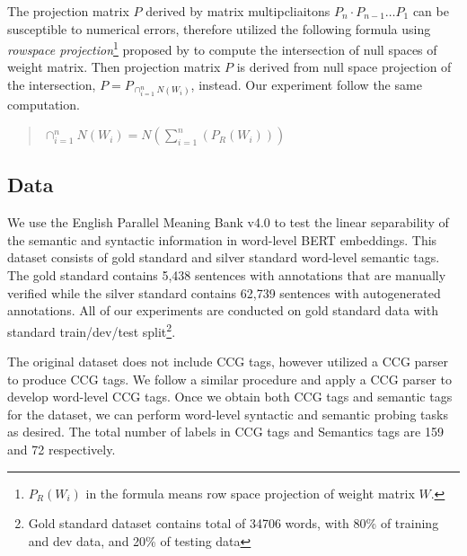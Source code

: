 \documentclass[11pt,a4paper]{article}
\begin{document}

The projection matrix $P$ derived by matrix multipcliaitons $P_n\cdot P_{n-1} \dots P_1$ can be susceptible to numerical errors, therefore \citealp{inlp} utilized the following formula using \textit{rowspace projection}\footnote{$P_R(W_i)$ in the formula means row space projection of weight matrix $W$.}  proposed by \citealp{ben-israel_2015} to compute the intersection of null spaces of weight matrix. Then projection matrix $P$ is derived from null space projection of the intersection, $P=P_{\cap_{i=1}^n N(W_i)}$, instead. Our experiment follow the same computation. 

\begin{quote}
    $\cap_{i=1}^n N(W_i) = N(\sum_{i=1}^n(P_R(W_i)) )$ 
\end{quote}





\subsection{Data}
\label{sec:data}

We use the English Parallel Meaning Bank v4.0 \citep{pmbData} to test the linear separability of the semantic and syntactic information in word-level BERT embeddings. This dataset consists of gold standard and silver standard word-level semantic tags. The gold standard contains 5,438 sentences with annotations that are manually verified while the silver standard contains 62,739 sentences with autogenerated annotations. All of our experiments are conducted on gold standard data with standard train/dev/test split\footnote{Gold standard dataset contains total of 34706 words, with 80\% of training and dev data, and 20\% of testing data}. 

The original dataset does not include CCG tags, however \citealp{pmbData} utilized a CCG parser to produce CCG tags. We follow a similar procedure and apply a CCG parser \citep{ccg_tagger} to develop word-level CCG tags. Once we obtain both CCG tags and semantic tags for the dataset, we can perform word-level syntactic and semantic probing tasks as desired. The total number of labels in CCG tags and Semantics tags are 159 and 72 respectively.
\end{document}
